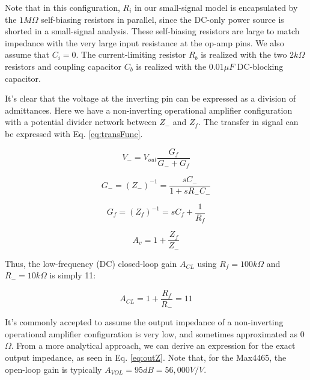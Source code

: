\documentclass[journal]{IEEEtran}
\begin{document}
Note that in this configuration, $R_i$ in our small-signal model is encapsulated by the $1 M\Omega$ self-biasing resistors in parallel, since the DC-only power source is shorted in a small-signal analysis. These self-biasing resistors are large to match impedance with the very large input resistance at the op-amp pins. We also assume that $C_i = 0$. The current-limiting resistor $R_b$ is realized with the two $2 k\Omega$ resistors and coupling capacitor $C_b$ is realized with the $0.01 \mu F$ DC-blocking capacitor. 

It's clear that the voltage at the inverting pin can be expressed as a division of admittances. Here we have a non-inverting operational amplifier configuration with a potential divider network between $Z_{-}$ and $Z_{f}$. The transfer in signal can be expressed with Eq. \ref{eq:transFunc}.

\begin{figure}[ht]

	\begin{equation}
		V_{-} = V_{out} \frac{G_{f}}{G_{-} + G_{f}}
		\label{eq:invertingPin}
	\end{equation}
	
	\begin{equation}
		G_{-} = (Z_{-})^{-1} = \frac{sC_{-}}{1 + sR_{-}C_{-}} 
		\label{eq:Gminus}
	\end{equation}

	\begin{equation}
		G_{f} = (Z_{f})^{-1} = sC_{f} + \frac{1}{R_{f}}
		\label{eq:Gf}
	\end{equation}
	
	\begin{equation}
		A_{v} = 1 + \frac{Z_{f}}{Z_{-}}
		\label{eq:transFunc}
	\end{equation}
	
\end{figure}

Thus, the low-frequency (DC) closed-loop gain $A_{CL}$ using $R_{f} = 100 k\Omega$ and $R_{-} = 10 k\Omega$ is simply 11:

\begin{figure}[ht]

	\begin{equation}
		A_{CL} = 1 + \frac{R_{f}}{R_{-}} = 11
		\label{eq:lfGain}
	\end{equation}
	
\end{figure}

It's commonly accepted to assume the output impedance of a non-inverting operational amplifier configuration is very low, and sometimes approximated as 0$\Omega$. From a more analytical approach, we can derive an expression for the exact output impedance, as seen in Eq. \ref{eq:outZ}. Note that, for the Max4465, the open-loop gain is typically $A_{VOL} = 95 dB = 56,000 V/V$. 
\end{document}
